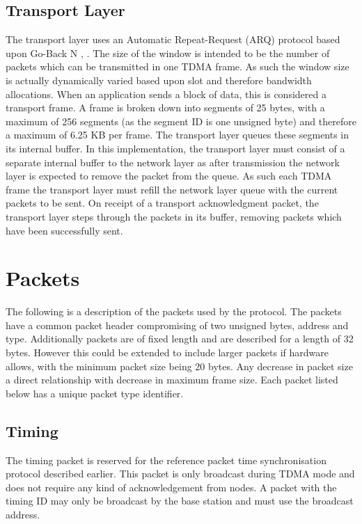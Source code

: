 \documentclass[parskip]{cs4rep}
\begin{document}
\subsection{Transport Layer}

The transport layer uses an Automatic Repeat-Request (ARQ) protocol based upon Go-Back N \cite{PR6}, \cite{PR7}. The size of the window is intended to be the number of packets which can be transmitted in one TDMA frame. As such the window size is actually dynamically varied based upon slot and therefore bandwidth allocations. When an application sends a block of data, this is considered a transport frame. A frame is broken down into segments of 25 bytes, with a maximum of 256 segments (as the segment ID is one unsigned byte) and therefore a maximum of 6.25 KB per frame. The transport layer queues these segments in its internal buffer. In this implementation, the transport layer must consist of a separate internal buffer to the network layer as after transmission the network layer is expected to remove the packet from the queue. As such each TDMA frame the transport layer must refill the network layer queue with the current packets to be sent. On receipt of a transport acknowledgment packet, the transport layer steps through the packets in its buffer, removing packets which have been successfully sent.

\section{Packets}

The following is a description of the packets used by the protocol. The packets have a common packet header compromising of two unsigned bytes, address and type. Additionally packets are of fixed length and are described for a length of 32 bytes. However this could be extended to include larger packets if hardware allows, with the minimum packet size being 20 bytes. Any decrease in packet size a direct relationship with decrease in maximum frame size. Each packet listed below has a unique packet type identifier.

\subsection{Timing}

The timing packet is reserved for the reference packet time synchronisation protocol described earlier. This packet is only broadcast during TDMA mode and does not require any kind of acknowledgement from nodes. A packet with the timing ID may only be broadcast by the base station and must use the broadcast address.
\end{document}
